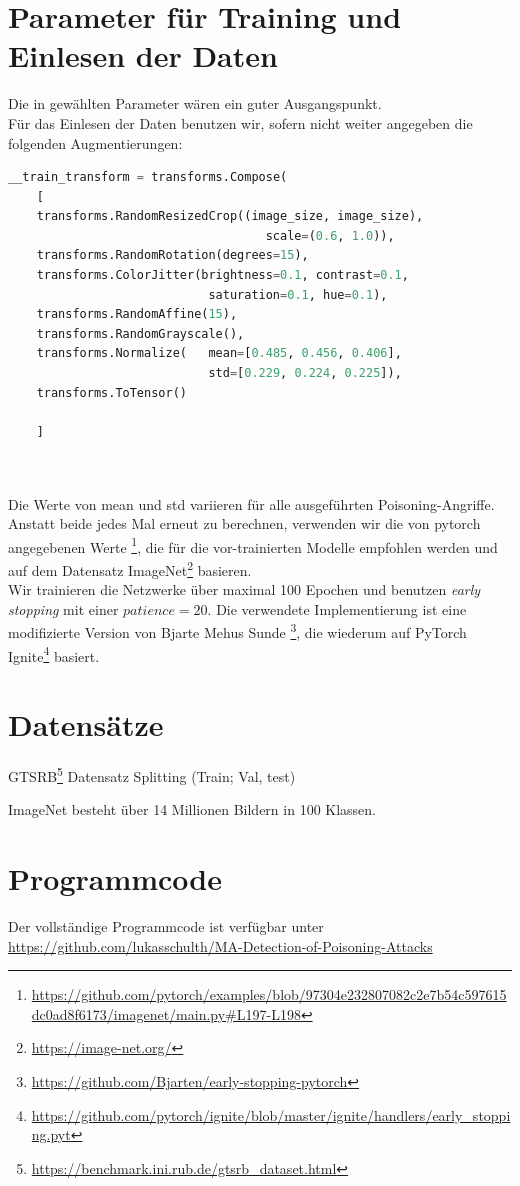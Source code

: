 \documentclass[twoside, 11pt,a4paper]{article}
\numberwithin{equation}{section}
\begin{document}
	\section{Parameter für Training und Einlesen der Daten}
	Die in \cite{CH} gewählten Parameter wären ein guter Ausgangspunkt.\\
	Für das Einlesen der Daten benutzen wir, sofern nicht weiter angegeben die folgenden Augmentierungen:
	
	\begin{lstlisting}[language=Python, caption=Augemntierung beim Einlesen der Daten]
	__train_transform = transforms.Compose(
	[
	transforms.RandomResizedCrop((image_size, image_size), 
									scale=(0.6, 1.0)),
	transforms.RandomRotation(degrees=15),
	transforms.ColorJitter(brightness=0.1, contrast=0.1, 
							saturation=0.1, hue=0.1),
	transforms.RandomAffine(15),
	transforms.RandomGrayscale(),
	transforms.Normalize(	mean=[0.485, 0.456, 0.406], 
	                 		std=[0.229, 0.224, 0.225]),
	transforms.ToTensor()

	]
	
	
	\end{lstlisting}
	Die Werte von mean und std variieren für alle ausgeführten Poisoning-Angriffe. Anstatt beide jedes Mal erneut zu berechnen, verwenden wir die von pytorch angegebenen Werte \footnote{\url{https://github.com/pytorch/examples/blob/97304e232807082c2e7b54c597615dc0ad8f6173/imagenet/main.py\#L197-L198}}, die für die vor-trainierten Modelle empfohlen werden und auf dem Datensatz ImageNet\footnote{\url{https://image-net.org/}} basieren.\\ 
	Wir trainieren die Netzwerke über maximal 100 Epochen und benutzen \textit{early stopping} mit einer $patience=20$. Die verwendete Implementierung ist eine modifizierte Version von Bjarte Mehus Sunde \footnote{\url{https://github.com/Bjarten/early-stopping-pytorch}}, die wiederum auf PyTorch Ignite\footnote{\url{https://github.com/pytorch/ignite/blob/master/ignite/handlers/early\_stopping.pyt}} basiert.\\
	\section{Datensätze}
	GTSRB\footnote{\url{https://benchmark.ini.rub.de/gtsrb_dataset.html}}
	Datensatz Splitting (Train; Val, test)
	
	ImageNet besteht über 14 Millionen Bildern in 100 Klassen.
	\section{Programmcode}
	Der vollständige Programmcode ist verfügbar unter \url{https://github.com/lukasschulth/MA-Detection-of-Poisoning-Attacks}
	
\end{document}
